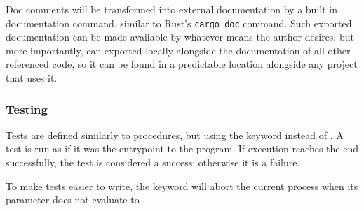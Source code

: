 Doc comments will be transformed into external documentation by a built
in documentation command, similar to Rust's \texttt{cargo doc} command.
Such exported documentation can be made available by whatever means the
author desires, but more importantly, can exported locally alongside the
documentation of all other referenced code, so it can be found in a
predictable location alongside any project that uses it.

\subsubsection{Testing}

Tests are defined similarly to procedures, but using the keyword 
instead of . A test is run as if it was the entrypoint to the
program. If execution reaches the end successfully, the test is
considered a success; otherwise it is a failure.


To make tests easier to write, the  keyword will abort the
current process when its parameter does not evaluate to .
